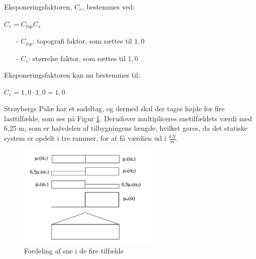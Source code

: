 Eksponeringsfaktoren, $C_e$, bestemmes ved:
\begin{center}
$C_e=C_{top}C_s$
\end{center}
\begin{itemize}
	\item[-] $C_{top}$: topografi faktor, som sættes til $1,\!0$ \citep[ tabel 5.1 kapitel 5.2]{EU91}
	\item[-] $C_s$: størrelse faktor, som sættes til $1,\!0$ \citep[ kapitel 5.2]{EU91}
\end{itemize}
Eksponeringsfaktoren kan nu bestemmes til:
\begin{center}
$C_e=1,\!0\cdot 1,\!0=1,\!0$
\end{center}
Strøybergs Palæ har et sadeltag, og dermed skal der tages højde for fire lasttilfælde, som ses på Figur \ref{fig:sne}. Derudover multipliceres snetilfældets værdi med 6,25 m, som er halvdelen af tilbygningens længde, hvilket gøres, da det statiske system er opdelt i tre rammer, for at få værdien ud i $\frac{kN}{m}$.

\begin{figure}[htbp]
	\centering
	\includegraphics[width=0.6\textwidth]{billeder/snelasttilfaelde.png}
	\caption{Fordeling af sne i de fire tilfælde \citep[ kapitel 5.3.3]{EU91}}
	\label{fig:sne}
\end{figure}

